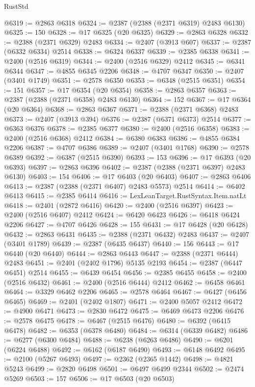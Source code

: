 \begin{lexlean}{RustStd}
\begin{coremodule}
{\begin{coremodule}
{{{{{{{{{{{{{{{{{{{{{{{{{{{{{{{{{{{{{{{{{{{{{{{{{{@6319 := @2863 @6318
@6324 := @2387 (@2388 (@2371 @6319) @2483 @6130)
@6325 := 150
@6328 := @17 @6325 (@20 @6325)
@6329 := @2863 @6328
@6332 := @2388 (@2371 @6329) @2483
@6334 := @2407 (@3913 @607)
@6337 := @2387 (@6332 @6334) @2514
@6338 := @6324 @6337
@6339 := @2385 @6338
@6341 := @2400 (@2516 @6319)
@6344 := @2400 (@2516 @6329) @2412
@6345 := @6341 @6344
@6347 := @4855 @6345 @2206
@6348 := @4707 @6347
@6350 := @2407 (@3401 @1749)
@6351 := @2578 @6350
@6353 := @6348 (@2515 @6351)
@6354 := 151
@6357 := @17 @6354 (@20 @6354)
@6358 := @2863 @6357
@6363 := @2387 (@2388 (@2371 @6358) @2483 @6130)
@6364 := 152
@6367 := @17 @6364 (@20 @6364)
@6368 := @2863 @6367
@6371 := @2388 (@2371 @6368) @2483
@6373 := @2407 (@3913 @394)
@6376 := @2387 (@6371 @6373) @2514
@6377 := @6363 @6376
@6378 := @2385 @6377
@6380 := @2400 (@2516 @6358)
@6383 := @2400 (@2516 @6368) @2412
@6384 := @6380 @6383
@6386 := @4855 @6384 @2206
@6387 := @4707 @6386
@6389 := @2407 (@3401 @1768)
@6390 := @2578 @6389
@6392 := @6387 (@2515 @6390)
@6393 := 153
@6396 := @17 @6393 (@20 @6393)
@6397 := @2863 @6396
@6402 := @2387 (@2388 (@2371 @6397) @2483 @6130)
@6403 := 154
@6406 := @17 @6403 (@20 @6403)
@6407 := @2863 @6406
@6413 := @2387 (@2388 (@2371 @6407) @2483 @5573) @2514
@6414 := @6402 @6413
@6415 := @2385 @6414
@6416 := LexLeanTarget.RustSyntax.Item.natLt
@6418 := @2401 (@2872 @6416)
@6420 := @2400 (@2516 @6397)
@6423 := @2400 (@2516 @6407) @2412
@6424 := @6420 @6423
@6426 := @6418 @6424 @2206
@6427 := @4707 @6426
@6428 := 155
@6431 := @17 @6428 (@20 @6428)
@6432 := @2863 @6431
@6435 := @2388 (@2371 @6432) @2483
@6437 := @2407 (@3401 @1789)
@6439 := @2387 (@6435 @6437)
@6440 := 156
@6443 := @17 @6440 (@20 @6440)
@6444 := @2863 @6443
@6447 := @2388 (@2371 @6444) @2483
@6451 := @2401 (@2402 @1796) @5135 @2193
@6454 := @2387 (@6447 @6451) @2514
@6455 := @6439 @6454
@6456 := @2385 @6455
@6458 := @2400 (@2516 @6432)
@6461 := @2400 (@2516 @6444) @2412
@6462 := @6458 @6461
@6464 := @3329 @6462 @2206
@6465 := @2578 @6464
@6467 := @6427 (@6456 @6465)
@6469 := @2401 (@2402 @1807)
@6471 := @2400 @5057 @2412
@6472 := @4900 @6471
@6473 := @2830 @6472
@6475 := @6469 @6473 @2206
@6476 := @2578 @6475
@6478 := @6467 (@2515 @6476)
@6480 := @6392 (@6415 @6478)
@6482 := @6353 (@6378 @6480)
@6484 := @6314 (@6339 @6482)
@6486 := @6277 (@6300 @6484)
@6488 := @6238 (@6263 @6486)
@6490 := @6201 (@6224 @6488)
@6492 := @6162 (@6187 @6490)
@6493 := @6148 @6492
@6495 := @2100 (@5267 @6493)
@6497 := @2362 (@2365 @1442)
@6498 := @4821 @5243
@6499 := @2820 @6498
@6501 := @6497 @6499 @2344
@6502 := @2474 @5269
@6503 := 157
@6506 := @17 @6503 (@20 @6503)
}}}}}}}}}}}}}}}}}}}}}}}}}}}}}}}}}}}}}}}}}}}}}}}}}}
\end{coremodule}}
\end{coremodule}
\end{lexlean}

